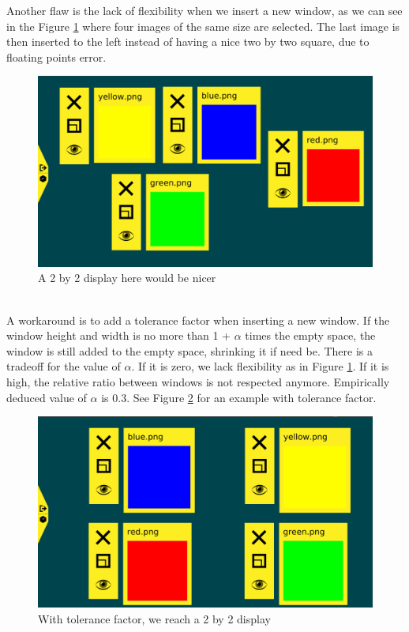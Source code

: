 \documentclass{acmtog}
\begin{document}
Another flaw is the lack of flexibility when we insert a new window, as we can see in the Figure \ref{fig:Equalbuggy} where four images of the same size are selected. The last image is then inserted to the left instead of having a nice two by two square, due to floating points error. 
\begin{figure}
  \includegraphics[width=\textwidth]{Images/4-equalbuggyCropped.png}
  \caption{A 2 by 2 display here would be nicer}
  \label{fig:Equalbuggy}
\end{figure}
\\ 
A workaround is to add a tolerance factor when inserting a new window. If the window height and width is no more than 1 + $\alpha$ times the empty space, the window is still added to the empty space, shrinking it if need be. There is a tradeoff for the value of $\alpha$. If it is zero, we lack flexibility as in Figure \ref{fig:Equalbuggy}.
If it is high, the relative ratio between windows is not respected anymore. Empirically deduced value of $\alpha$ is 0.3. See Figure \ref{fig:Equalright} for an example with tolerance factor.

\begin{figure}
  \includegraphics[width=\textwidth]{Images/4-equalToleranceCropped.png}
  \caption{With tolerance factor, we reach a 2 by 2 display}
  \label{fig:Equalright}
\end{figure}
\end{document}
